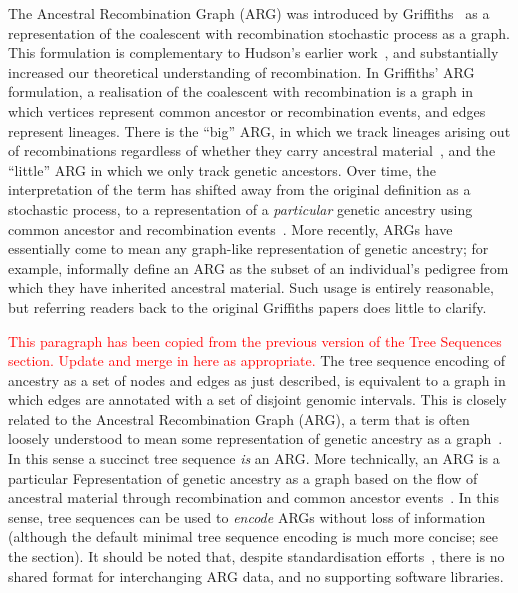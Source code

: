 \documentclass{article}
\newcommand{\jkcomment}[1]{\textcolor{red}{#1}}
\begin{document}
The Ancestral Recombination Graph (ARG) was introduced by
Griffiths~\citep{griffiths1991two,griffiths1997ancestral}
as a representation of the coalescent with recombination
stochastic process as a graph.
This formulation is complementary to Hudson's earlier
work~\citep{hudson1983properties}, and substantially increased our theoretical
understanding of recombination. In Griffiths' ARG formulation,
a realisation of the coalescent with recombination is a graph in which
vertices represent common ancestor or recombination events, and edges represent
lineages. There is the ``big'' ARG, in which we track lineages arising out of
recombinations regardless of whether they carry ancestral
material~\citep{ethier1990two},
and the ``little'' ARG in which we only track genetic ancestors.
Over time, the interpretation of the term
has shifted away from the original definition as a stochastic
process, to a representation of a \emph{particular} genetic ancestry
using common ancestor and recombination
events~\citep[e.g.][]{minichiello2006mapping}.
More recently, ARGs have essentially come to mean any graph-like representation
of genetic ancestry; for example,
\cite{mathieson2020ancestry} informally define an ARG as the subset of an
individual's pedigree from which they have inherited ancestral material.
Such usage is entirely reasonable, but referring readers back to the
original Griffiths papers does little to clarify.


\jkcomment{This paragraph has been copied from the previous
version of the Tree Sequences section. Update and merge in here
as appropriate.}
The tree sequence encoding of ancestry as a set of nodes and edges
as just described, is equivalent to a graph in which edges
are annotated with a set of disjoint genomic intervals.
This is closely related to the Ancestral Recombination Graph (ARG),
a term that is often loosely understood
to mean some representation of genetic
ancestry as a graph~\citep[e.g.][]{mathieson2020ancestry}.
In this sense a succinct tree sequence \emph{is} an ARG.
More technically, an ARG is a particular
Fepresentation of genetic ancestry as a graph based on the
flow of ancestral material through recombination and common
ancestor events~\citep{griffiths1991two,griffiths1997ancestral}.
In this sense, tree sequences can be used to \emph{encode}
ARGs without loss of information (although
the default minimal tree sequence encoding is
much more concise; see the  section).
It should be noted that, despite standardisation
efforts~\citep{cardona2008extended,mcgill2013graphml}, there is
no shared format for interchanging ARG data, and no supporting software
libraries.
\end{document}
